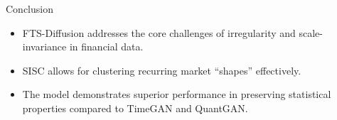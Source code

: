 \begin{frame}{Conclusion}
    \begin{itemize}
        \item FTS-Diffusion addresses the core challenges of irregularity and scale-invariance in financial data.
        \item SISC allows for clustering recurring market ``shapes'' effectively.
        \item The model demonstrates superior performance in preserving statistical properties compared to TimeGAN and QuantGAN.
    \end{itemize}
\end{frame}



